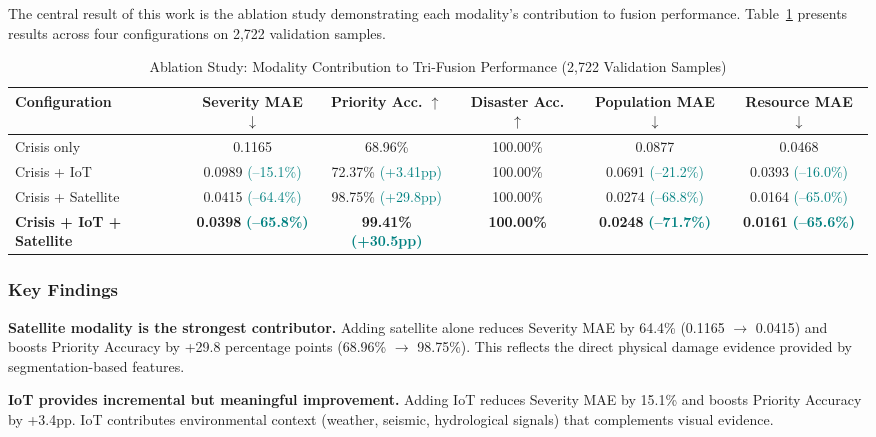\documentclass[journal]{IEEEtran}
\begin{document}
The central result of this work is the ablation study demonstrating each modality's contribution to fusion performance. Table~\ref{tab:ablation} presents results across four configurations on 2,722 validation samples.

\begin{table}[!t]
\centering
\caption{Ablation Study: Modality Contribution to Tri-Fusion Performance (2,722 Validation Samples)}
\label{tab:ablation}
\begin{tabular}{lccccc}
\toprule
\textbf{Configuration} & \textbf{Severity MAE} $\downarrow$ & \textbf{Priority Acc.} $\uparrow$ & \textbf{Disaster Acc.} $\uparrow$ & \textbf{Population MAE} $\downarrow$ & \textbf{Resource MAE} $\downarrow$ \\
\midrule
Crisis only & 0.1165 & 68.96\% & 100.00\% & 0.0877 & 0.0468 \\
Crisis + IoT & 0.0989 \textcolor{teal}{\scriptsize(--15.1\%)} & 72.37\% \textcolor{teal}{\scriptsize(+3.41pp)} & 100.00\% & 0.0691 \textcolor{teal}{\scriptsize(--21.2\%)} & 0.0393 \textcolor{teal}{\scriptsize(--16.0\%)} \\
Crisis + Satellite & 0.0415 \textcolor{teal}{\scriptsize(--64.4\%)} & 98.75\% \textcolor{teal}{\scriptsize(+29.8pp)} & 100.00\% & 0.0274 \textcolor{teal}{\scriptsize(--68.8\%)} & 0.0164 \textcolor{teal}{\scriptsize(--65.0\%)} \\
\textbf{Crisis + IoT + Satellite} & \textbf{0.0398} \textcolor{teal}{\scriptsize\textbf{(--65.8\%)}} & \textbf{99.41\%} \textcolor{teal}{\scriptsize\textbf{(+30.5pp)}} & \textbf{100.00\%} & \textbf{0.0248} \textcolor{teal}{\scriptsize\textbf{(--71.7\%)}} & \textbf{0.0161} \textcolor{teal}{\scriptsize\textbf{(--65.6\%)}} \\
\bottomrule
\end{tabular}
\end{table}

\subsubsection{Key Findings}

\textbf{Satellite modality is the strongest contributor.} Adding satellite alone reduces Severity MAE by 64.4\% (0.1165 $\to$ 0.0415) and boosts Priority Accuracy by +29.8 percentage points (68.96\% $\to$ 98.75\%). This reflects the direct physical damage evidence provided by segmentation-based features.

\textbf{IoT provides incremental but meaningful improvement.} Adding IoT reduces Severity MAE by 15.1\% and boosts Priority Accuracy by +3.4pp. IoT contributes environmental context (weather, seismic, hydrological signals) that complements visual evidence.
\end{document}
